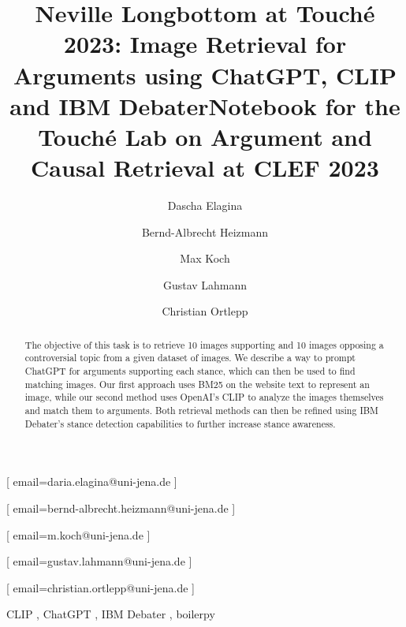 \documentclass[
]{ceurart}
\begin{document}


\title{Neville Longbottom at Touch\'e 2023: Image Retrieval for Arguments using ChatGPT, CLIP and IBM Debater}
\title[mode=sub]{Notebook for the Touch{\'e} Lab on Argument and Causal Retrieval at CLEF 2023}


\author[1]{Dascha Elagina}[%
email=daria.elagina@uni-jena.de
]
\author[1]{Bernd-Albrecht Heizmann}[%
email=bernd-albrecht.heizmann@uni-jena.de
]
\author[1]{Max Koch}[%
email=m.koch@uni-jena.de
]
\author[1]{Gustav Lahmann}[%
email=gustav.lahmann@uni-jena.de
]
\author[1]{Christian Ortlepp}[%
email=christian.ortlepp@uni-jena.de
]


\address[1]{Friedrich-Schiller University Jena,
07743, Jena}


\begin{abstract}
The objective of this task is to retrieve 10 images supporting and 10 images opposing a controversial topic from a given dataset of images. We describe a way to prompt ChatGPT for arguments supporting each stance, which can then be used to find matching images. Our first approach uses BM25 on the website text to represent an image, while our second method uses OpenAI's CLIP to analyze the images themselves and match them to arguments. Both retrieval methods can then be refined using IBM Debater's stance detection capabilities to further increase stance awareness.
\end{abstract}

\begin{keywords}
  CLIP \sep
  ChatGPT \sep
  IBM Debater \sep
	boilerpy
\end{keywords}

\maketitle
\end{document}
